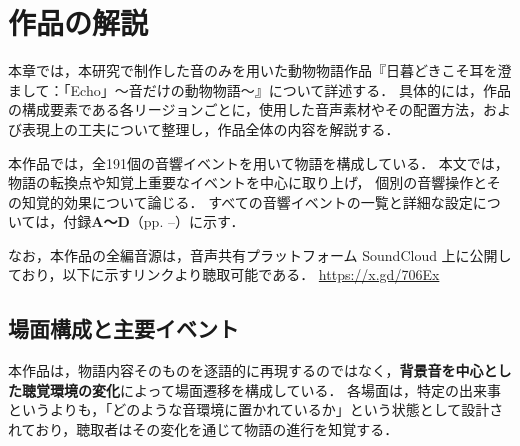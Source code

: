



\section{作品の解説}

本章では，本研究で制作した音のみを用いた動物物語作品『日暮どきこそ耳を澄まして：「Echo」〜音だけの動物物語〜』について詳述する．
具体的には，作品の構成要素である各リージョンごとに，使用した音声素材やその配置方法，および表現上の工夫について整理し，作品全体の内容を解説する．

本作品では，全191個の音響イベントを用いて物語を構成している．
本文では，物語の転換点や知覚上重要なイベントを中心に取り上げ，
個別の音響操作とその知覚的効果について論じる．
すべての音響イベントの一覧と詳細な設定については，付録\textbf{A〜D}（pp. \pageref{app:all-events}--\pageref{app:events}）に示す．

なお，本作品の全編音源は，音声共有プラットフォーム SoundCloud 上に公開しており，以下に示すリンクより聴取可能である．
\url{https://x.gd/706Ex}



\subsection{場面構成と主要イベント}

本作品は，物語内容そのものを逐語的に再現するのではなく，\textbf{背景音を中心とした聴覚環境の変化}によって場面遷移を構成している．
各場面は，特定の出来事というよりも，「どのような音環境に置かれているか」という状態として設計されており，聴取者はその変化を通じて物語の進行を知覚する．

